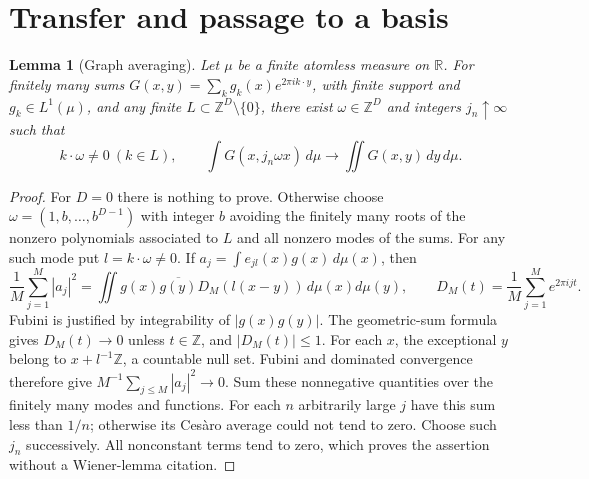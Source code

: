 \documentclass[reqno,a4paper,12pt]{amsart}
\newtheorem{lemma}[theorem]{Lemma}
\newcommand{\R}{\mathbb R}
\newcommand{\Z}{\mathbb Z}
\begin{document}
\section{Transfer and passage to a basis}
\begin{lemma}[Graph averaging]\label{graph}
Let $\mu$ be a finite atomless measure on $\R$. For finitely many sums
$G(x,y)=\sum_k g_k(x)e^{2\pi ik\cdot y}$, with finite support and
$g_k\in L^1(\mu)$, and any finite
$L\subset\Z^D\setminus\{0\}$, there exist $\omega\in\Z^D$ and
integers $j_n\uparrow\infty$ such that
\[
 k\cdot\omega\ne0\ (k\in L),\qquad
 \int G(x,j_n\omega x)\,d\mu\longrightarrow\iint G(x,y)\,dy\,d\mu.
\]
\end{lemma}
\begin{proof}
For $D=0$ there is nothing to prove. Otherwise choose
$\omega=(1,b,\ldots,b^{D-1})$ with integer $b$ avoiding the finitely
many roots of the nonzero polynomials associated to $L$ and all nonzero
modes of the sums. For any such mode put $l=k\cdot\omega\ne0$.
If $a_j=\int e_{jl}(x)g(x)\,d\mu(x)$, then
\[
 \frac1M\sum_{j=1}^M|a_j|^2
 =\iint g(x)\overline{g(y)}D_M(l(x-y))\,d\mu(x)d\mu(y),\qquad
 D_M(t)=\frac1M\sum_{j=1}^Me^{2\pi ijt}.
\]
Fubini is justified by integrability of $|g(x)g(y)|$.
The geometric-sum formula gives $D_M(t)\to0$ unless $t\in\Z$,
and $|D_M(t)|\le1$. For each $x$, the exceptional $y$ belong to
$x+l^{-1}\Z$, a countable null set. Fubini and dominated convergence
therefore give $M^{-1}\sum_{j\le M}|a_j|^2\to0$.
Sum these nonnegative quantities over the finitely many modes and
functions. For each $n$ arbitrarily large $j$ have this sum less than
$1/n$; otherwise its Ces\`aro average could not tend to zero.
Choose such $j_n$ successively. All nonconstant terms tend to zero,
which proves the assertion without a Wiener-lemma citation.
\end{proof}
\end{document}
